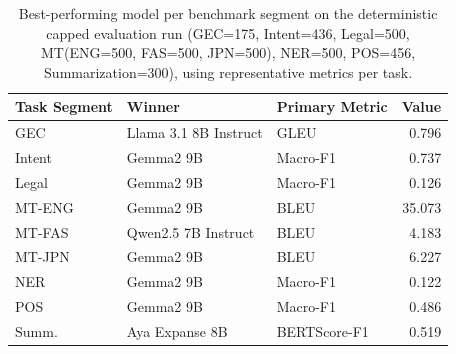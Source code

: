 \begin{table}[t]
\centering
\caption{Best-performing model per benchmark segment on the deterministic capped evaluation run (GEC=175, Intent=436, Legal=500, MT(ENG=500, FAS=500, JPN=500), NER=500, POS=456, Summarization=300), using representative metrics per task.}
\label{tab:capped-task-winners}
\begin{tabular}{lllr}
\toprule
Task Segment & Winner & Primary Metric & Value \\
\midrule
GEC & Llama 3.1 8B Instruct & GLEU & 0.796 \\
Intent & Gemma2 9B & Macro-F1 & 0.737 \\
Legal & Gemma2 9B & Macro-F1 & 0.126 \\
MT-ENG & Gemma2 9B & BLEU & 35.073 \\
MT-FAS & Qwen2.5 7B Instruct & BLEU & 4.183 \\
MT-JPN & Gemma2 9B & BLEU & 6.227 \\
NER & Gemma2 9B & Macro-F1 & 0.122 \\
POS & Gemma2 9B & Macro-F1 & 0.486 \\
Summ. & Aya Expanse 8B & BERTScore-F1 & 0.519 \\
\bottomrule
\end{tabular}
\end{table}

\begin{table}[t]
\centering
\caption{Per-model results for GEC.}
\label{tab:appendix-gec-analysis}
\centering{}
\end{table}

\begin{table}[t]
\caption{Per-model results for Intent.}
\label{tab:appendix-intent-classification-analysis}
\centering{}
\end{table}

